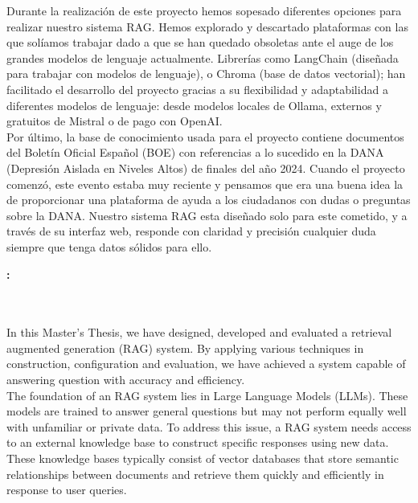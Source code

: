 \noindent Durante la realización de este proyecto hemos sopesado diferentes opciones para realizar nuestro sistema RAG. Hemos explorado y descartado plataformas con las que solíamos trabajar dado a que se han quedado obsoletas ante el auge de los grandes modelos de lenguaje actualmente. Librerías como LangChain (diseñada para trabajar con modelos de lenguaje), o Chroma (base de datos vectorial); han facilitado el desarrollo del proyecto gracias a su flexibilidad y adaptabilidad a diferentes modelos de lenguaje: desde modelos locales de Ollama, externos y gratuitos de Mistral o de pago con OpenAI.\\

\noindent Por último, la base de conocimiento usada para el proyecto contiene documentos del Boletín Oficial Español (BOE) con referencias a lo sucedido en la DANA (Depresión Aislada en Niveles Altos) de finales del año 2024. Cuando el proyecto comenzó, este evento estaba muy reciente y pensamos que era una buena idea la de proporcionar una plataforma de ayuda a los ciudadanos con dudas o preguntas sobre la DANA. Nuestro sistema RAG esta diseñado solo para este cometido, y a través de su interfaz web, responde con claridad y precisión cualquier duda siempre que tenga datos sólidos para ello.

\cleardoublepage


\thispagestyle{empty}


\begin{center}
{\large\bfseries \myTitleEn: \mySubTitleEn}\\
\end{center}

\\

\vspace{0.7cm}
\\

In this Master's Thesis, we have designed, developed and evaluated a retrieval augmented generation (RAG) system. By applying various techniques in construction, configuration and evaluation, we have achieved a system capable of answering question with accuracy and efficiency.\\

\noindent The foundation of an RAG system lies in Large Language Models (LLMs). These models are trained to answer general questions but may not perform equally well with unfamiliar or private data. To address this issue, a RAG system needs access to an external knowledge base to construct specific responses using new data. These knowledge bases typically consist of vector databases that store semantic relationships between documents and retrieve them quickly and efficiently in response to user queries.\\

